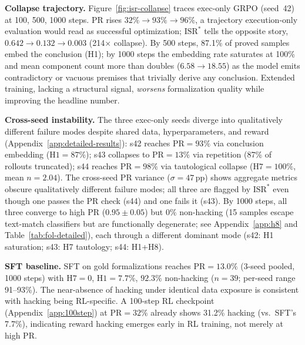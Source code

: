 \textbf{Collapse trajectory.}
Figure~\ref{fig:isr-collapse} traces exec-only GRPO (seed~42) at 100, 500, 1000 steps.
PR rises $32\%\to93\%\to96\%$, a trajectory execution-only evaluation would read as successful optimization; $\text{ISR}^*$ tells the opposite story, $0.642\to0.132\to0.003$ (214$\times$ collapse). %
By 500 steps, 87.1\% of proved samples embed the conclusion (H1); by 1000 steps the embedding rate saturates at 100\% and mean component count more than doubles ($6.58\to18.55$) as the model emits contradictory or vacuous premises that trivially derive any conclusion.
Extended training, lacking a structural signal, \emph{worsens} formalization quality while improving the headline number.

\textbf{Cross-seed instability.}
The three exec-only seeds diverge into qualitatively different failure modes despite shared data, hyperparameters, and reward (Appendix~\ref{app:detailed-results}): s42 reaches $\text{PR}{=}93\%$ via conclusion embedding ($\text{H1}{=}87\%$); s43 collapses to $\text{PR}{=}13\%$ via repetition (87\% of rollouts truncated); s44 reaches $\text{PR}{=}98\%$ via tautological collapse ($\text{H7}{=}100\%$, mean $n{=}2.04$). %
The cross-seed PR variance ($\sigma{=}47$\,pp) shows aggregate metrics obscure qualitatively different failure modes; all three are flagged by $\text{ISR}^*$ even though one passes the PR check (s44) and one fails it (s43).
By 1000 steps, all three converge to high PR ($0.95{\pm}0.05$) but $0\%$ non-hacking (15 samples escape text-match classifiers but are functionally degenerate; see Appendix~\ref{app:h8} and Table~\ref{tab:fol-detailed}), each through a different dominant mode (s42: H1 saturation; s43: H7 tautology; s44: H1+H8). %

\textbf{SFT baseline.}
SFT on gold formalizations reaches $\text{PR}{=}13.0\%$ (3-seed pooled, 1000 steps) with $\text{H7}{=}0$, $\text{H1}{=}7.7\%$, $92.3\%$ non-hacking ($n{=}39$; per-seed range 91--93\%). %
The near-absence of hacking under identical data exposure is consistent with hacking being RL-specific.
A 100-step RL checkpoint (Appendix~\ref{app:100step}) at $\text{PR}{=}32\%$ already shows 31.2\% hacking (vs.\ SFT's 7.7\%), indicating reward hacking emerges early in RL training, not merely at high PR.

